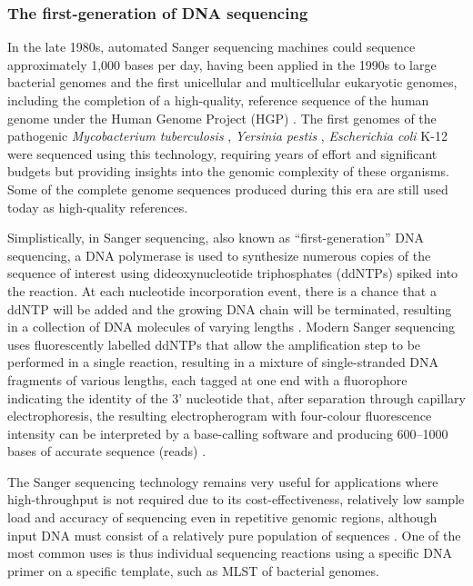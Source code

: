 \subsubsection{The first-generation of DNA sequencing} \label{ssec:1st_gen_seq}

In the late 1980s, automated Sanger sequencing machines could sequence approximately 1,000 bases per day, having been applied in the 1990s to large bacterial genomes and the first unicellular and multicellular eukaryotic genomes, including the completion of a high-quality, reference sequence of the human genome under the Human Genome Project (HGP) \citep{koch_sequencing_2021, collins_human_1995}. The first genomes of the pathogenic \textit{Mycobacterium tuberculosis} \citep{cole_deciphering_1998}, \textit{Yersinia pestis} \citep{parkhill_genome_2001}, \textit{Escherichia coli} K-12 \citep{blattner_complete_1997} were sequenced using this technology, requiring years of effort and significant budgets but providing insights into the genomic complexity of these organisms. Some of the complete genome sequences produced during this era are still used today as high-quality references. 

Simplistically, in Sanger sequencing, also known as “first-generation” DNA sequencing, a DNA polymerase is used to synthesize numerous copies of the sequence of interest using dideoxynucleotide triphosphates (ddNTPs) spiked into the reaction. At each nucleotide incorporation event, there is a chance that a ddNTP will be added and the growing DNA chain will be terminated, resulting in a collection of DNA molecules of varying lengths \citep{sanger_dna_1977, hagemann_overview_2015}. Modern Sanger sequencing uses fluorescently labelled ddNTPs that allow the amplification step to be performed in a single reaction, resulting in a mixture of single-stranded DNA fragments of various lengths, each tagged at one end with a fluorophore indicating the identity of the 3' nucleotide that, after separation through capillary electrophoresis, the resulting electropherogram with four-colour fluorescence intensity can be interpreted by a base-calling software and producing 600–1000 bases of accurate sequence (reads) \citep{hagemann_overview_2015}. 

The Sanger sequencing technology remains very useful for applications where high-throughput is not required due to its cost-effectiveness, relatively low sample load and accuracy of sequencing even in repetitive genomic regions, although input DNA must consist of a relatively pure population of sequences \citep{slatko_overview_2018}. One of the most common uses is thus individual sequencing reactions using a specific DNA primer on a specific template, such as MLST of bacterial genomes. 

